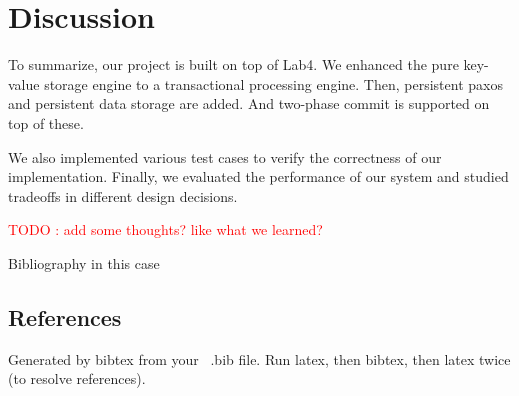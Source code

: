 \documentclass{vldb}
\begin{document}
\section{Discussion}

To summarize, our project is built on top of Lab4. We enhanced the 
pure key-value storage engine to a transactional processing engine.
Then, persistent paxos and persistent data storage are added. And 
two-phase commit is supported on top of these. 

We also implemented various test cases to verify the correctness of 
our implementation. Finally, we evaluated the performance of our 
system and studied tradeoffs in different design decisions.

\textcolor{red}{TODO : add some thoughts? like what we learned?}


Bibliography in this case

\subsection{References}
Generated by bibtex from your ~.bib file.  Run latex,
then bibtex, then latex twice (to resolve references).
\end{document}
